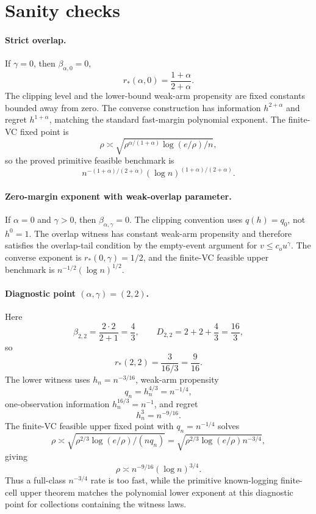 \documentclass[11pt]{article}
\theoremstyle{definition}
\theoremstyle{plain}
\theoremstyle{remark}
\begin{document}
\section{Sanity checks}
\paragraph{Strict overlap.}
If \(\gamma=0\), then \(\beta_{\alpha,0}=0\),
\[
r_*(\alpha,0)=\frac{1+\alpha}{2+\alpha}.
\]
The clipping level and the lower-bound weak-arm propensity are fixed
constants bounded away from zero.  The converse construction has information
\(h^{2+\alpha}\) and regret \(h^{1+\alpha}\), matching the standard
fast-margin polynomial exponent.  The finite-VC fixed point is
\[
\rho\asymp
\sqrt{\rho^{\alpha/(1+\alpha)}\log(e/\rho)/n},
\]
so the proved primitive feasible benchmark is
\[
n^{-(1+\alpha)/(2+\alpha)}
(\log n)^{(1+\alpha)/(2+\alpha)}.
\]

\paragraph{Zero-margin exponent with weak-overlap parameter.}
If \(\alpha=0\) and \(\gamma>0\), then
\(\beta_{\alpha,\gamma}=0\).  The clipping convention uses \(q(h)=q_0\),
not \(h^0=1\).  The overlap witness has constant weak-arm propensity and
therefore satisfies the overlap-tail condition by the empty-event argument
for \(v\le c_o u^\gamma\).  The converse exponent is
\(r_*(0,\gamma)=1/2\), and the finite-VC feasible upper benchmark is
\(n^{-1/2}(\log n)^{1/2}\).

\paragraph{Diagnostic point \((\alpha,\gamma)=(2,2)\).}
Here
\[
\beta_{2,2}=\frac{2\cdot2}{2+1}=\frac43,\qquad
D_{2,2}=2+2+\frac43=\frac{16}{3},
\]
so
\[
r_*(2,2)=\frac3{16/3}=\frac9{16}.
\]
The lower witness uses \(h_n=n^{-3/16}\), weak-arm propensity
\[
q_n=h_n^{4/3}=n^{-1/4},
\]
one-observation information \(h_n^{16/3}=n^{-1}\), and regret
\[
h_n^3=n^{-9/16}.
\]
The finite-VC feasible upper fixed point with \(q_n=n^{-1/4}\) solves
\[
\rho\asymp\sqrt{\rho^{2/3}\log(e/\rho)/(nq_n)}
=\sqrt{\rho^{2/3}\log(e/\rho)n^{-3/4}},
\]
giving
\[
\rho\asymp n^{-9/16}(\log n)^{3/4}.
\]
Thus a full-class \(n^{-3/4}\) rate is too fast, while the primitive
known-logging finite-cell upper theorem matches the polynomial lower exponent
at this diagnostic point for collections containing the witness laws.
\end{document}
